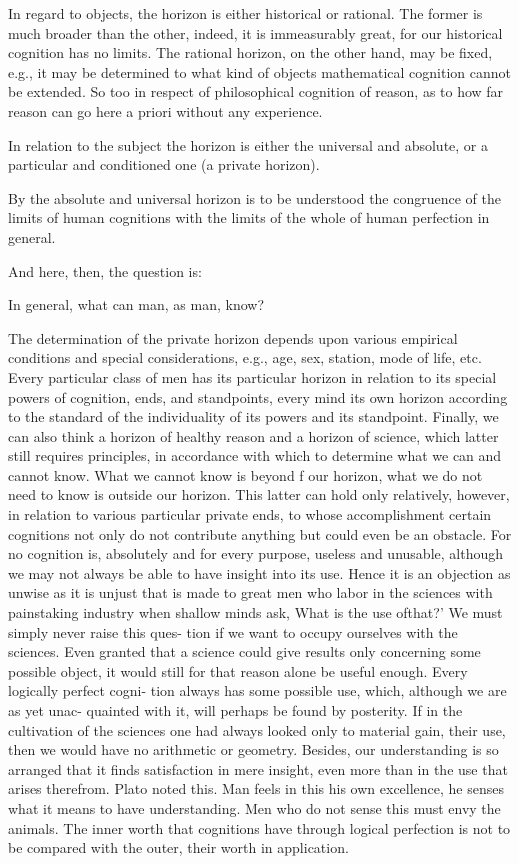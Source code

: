 In regard to objects, the horizon is either historical or rational.
The former is much broader than the other, indeed, it is immeasurably great,
for our historical cognition has no limits.
The rational horizon, on the other hand, may be fixed,
e.g., it may be determined to what kind of objects
mathematical cognition cannot be extended.
So too in respect of philosophical cognition of reason,
as to how far reason can go here a priori without any experience.

In relation to the subject the horizon is either the universal and absolute,
or a particular and conditioned one (a private horizon).

By the absolute and universal horizon is to be understood
the congruence of the limits of human cognitions with
the limits of the whole of human perfection in general.

And here, then, the question is:

In general, what can man, as man, know?

The determination of the private horizon depends upon various
empirical conditions and special considerations,
e.g., age, sex, station, mode of life, etc.
Every particular class of men has its particular horizon in relation
to its special powers of cognition, ends, and standpoints, every mind its
own horizon according to the standard of the individuality of its powers
and its standpoint. Finally, we can also think a horizon of healthy reason
and a horizon of science, which latter still requires principles, in accordance
with which to determine what we can and cannot know.
What we cannot know is beyond f our horizon, what we do not need to
know is outside our horizon. This latter can hold only relatively, however,
in relation to various particular private ends, to whose accomplishment
certain cognitions not only do not contribute anything but could even be
an obstacle. For no cognition is, absolutely and for every purpose, useless
and unusable, although we may not always be able to have insight into its
use. Hence it is an objection as unwise as it is unjust that is made to great
men who labor in the sciences with painstaking industry when shallow
minds ask, What is the use ofthat?' We must simply never raise this ques-
tion if we want to occupy ourselves with the sciences. Even granted that a
science could give results only concerning some possible object, it would
still for that reason alone be useful enough. Every logically perfect cogni-
tion always has some possible use, which, although we are as yet unac-
quainted with it, will perhaps be found by posterity. If in the cultivation of
the sciences one had always looked only to material gain, their use, then
we would have no arithmetic or geometry. Besides, our understanding is
so arranged that it finds satisfaction in mere insight, even more than in the
use that arises therefrom. Plato noted this. Man feels in this his own
excellence, he senses what it means to have understanding. Men who do
not sense this must envy the animals. The inner worth that cognitions have
through logical perfection is not to be compared with the outer, their worth
in application.


